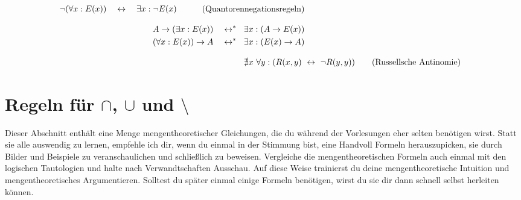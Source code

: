 \begin{align*}
\begin{split}
        \neg (\forall x: E(x)) \quad & \leftrightarrow\quad \exists x: \neg E(x) %
    \end{split} \tag{Quantorennegationsregeln} \\[0.8em]
    \begin{split}
        A \to( \exists x : E(x)) \quad & \leftrightarrow^*\quad\hspace{-.4em} \exists x : ( A\to E(x)) \\ %
        (\forall x : E(x)) \to A \quad & \leftrightarrow^*\quad\hspace{-.4em} \exists x : (E(x) \to A) %
    \end{split} \\[0.8em]
    \nexists x\ \forall y : (R(x,y) \ &\leftrightarrow\ \neg R(y,y)) \tag{Russellsche Antinomie}
\end{align*}
\endgroup





\section{Regeln für $\cap$, $\cup$ und $\setminus$} \label{anhang:capcupregeln}
Dieser Abschnitt enthält eine Menge mengentheoretischer Gleichungen, die du während der Vorlesungen eher selten benötigen wirst. Statt sie alle auswendig zu lernen, empfehle ich dir, wenn du einmal in der Stimmung bist, eine Handvoll Formeln herauszupicken, sie durch Bilder und Beispiele zu veranschaulichen und schließlich zu beweisen. Vergleiche die mengentheoretischen Formeln auch einmal mit den logischen Tautologien und halte nach Verwandtschaften Ausschau. Auf diese Weise trainierst du deine mengentheoretische Intuition und mengentheoretisches Argumentieren. Solltest du später einmal einige Formeln benötigen, wirst du sie dir dann schnell selbst herleiten können.

